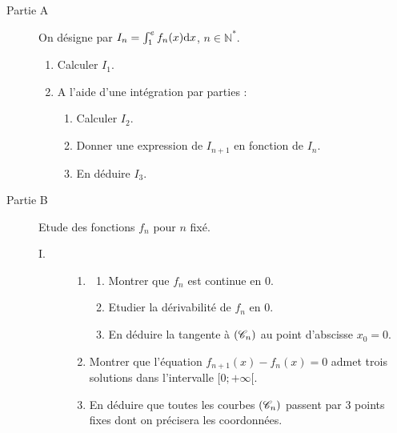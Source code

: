       \begin{description}
            \item[Partie A]
                  On d\'esigne par $I_n = \int_{1}^{e} f_n (x) \mathrm{d}x$, $n \in \mathbb{N}^*$.
                  \begin{enumerate}
                        \item Calculer $I_1$.
                        \item A l'aide d'une int\'egration par parties :
                              \begin{enumerate}
                                    \item Calculer $I_2$.
                                    \item Donner une expression de $I_{n+1}$ en fonction de $I_n$.
                                    \item En d\'eduire $I_3$.
                              \end{enumerate}
                  \end{enumerate}
            \item[Partie B] Etude des fonctions $f_n$ pour $n$ fix\'e.
                  \begin{description}
                        \item[I. ]
                              \begin{enumerate}
                                    \item \begin{enumerate}
                                                \item Montrer que $f_n$ est continue en $0$.
                                                \item Etudier la d\'erivabilit\'e de $f_n$ en $0$.
                                                \item En d\'eduire la tangente \`a $(\mathscr{C}_n)$ au point d'abscisse $x_0 = 0$.
                                          \end{enumerate}
                                    \item Montrer que l'\'equation $f_{n+1} (x) - f_n (x) = 0$ admet trois solutions dans
                                          l'intervalle $[0;+\infty[$.
                                    \item En d\'eduire que toutes les courbes $(\mathscr{C}_n)$ passent par 3 points fixes dont 
                                          on pr\'ecisera les coordonn\'ees.
                              \end{enumerate}

\end{description}
\end{description}
